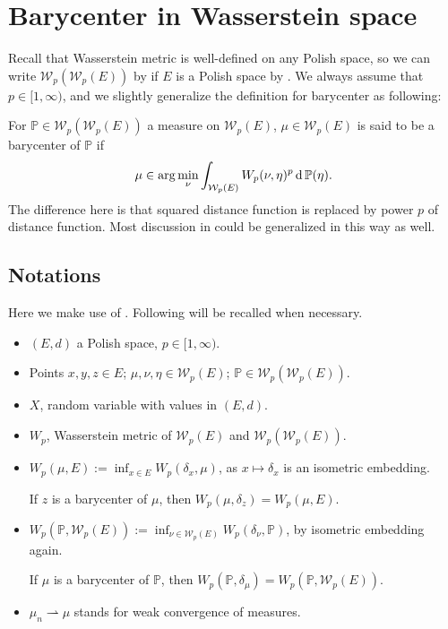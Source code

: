 \section{Barycenter in Wasserstein space}

Recall that Wasserstein metric is well-defined on any Polish space,
so we can write $\mathcal{W}_p(\mathcal{W}_p(E))$ by  if $E$ is a Polish space
by .
We always assume that $p \in [1, \infty)$,
and we slightly generalize the definition for barycenter as following:

\begin{defn}
	For $\mathbb{P} \in \mathcal{W}_p(\mathcal{W}_p(E))$ a measure on $\mathcal{W}_p(E)$,
	$\mu \in \mathcal{W}_p(E)$ is said to be a barycenter of $\mathbb{P}$ if
\[
	\mu \in \arg \min_{\nu} \int_{\mathcal{W}_p(E)} W_p(\nu, \eta)^p \operatorname{d} \mathbb{P} (\eta).
\]
The difference here is that squared distance function is replaced by power $p$ of distance function.
Most discussion in  could be generalized in this way as well.
\end{defn}

\subsection{Notations}

\label{subsection:convention}
Here we make use of .
Following will be recalled when necessary.

\begin{itemize}
	\item $(E,d)$ a Polish space, $p \in [1, \infty)$.
	\item Points $x,y,z \in E$; $\mu, \nu, \eta \in \mathcal{W}_p(E)$; $\mathbb{P} \in \mathcal{W}_p(\mathcal{W}_p(E))$.
	\item $X$, random variable with values in $(E, d)$.
	\item $W_p$, Wasserstein metric of $\mathcal{W}_p(E)$ and $\mathcal{W}_p(\mathcal{W}_p(E))$.
	\item $W_p(\mu, E):= \inf_{x \in E}W_p(\delta_x, \mu)$,
	      as $x \mapsto \delta_x$ is an isometric embedding.

	      If $z$ is a barycenter of $\mu$, then $W_p(\mu, \delta_z)=W_p(\mu, E)$.
	\item $W_p(\mathbb{P}, \mathcal{W}_p(E)) := \inf_{\nu \in \mathcal{W}_p(E)} W_p(\delta_\nu, \mathbb{P})$, by isometric embedding again.

	      If $\mu$ is a barycenter of $\mathbb{P}$, then $W_p(\mathbb{P}, \delta_\mu)=W_p(\mathbb{P}, \mathcal{W}_p(E))$.
	\item $\mu_n \rightharpoonup \mu$ stands for weak convergence of measures.

\end{itemize}

